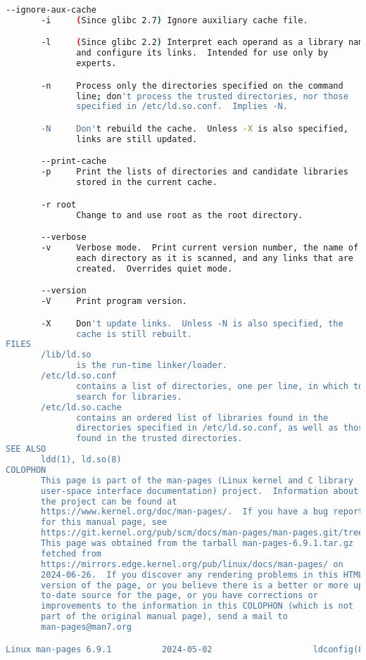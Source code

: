 {{\begin{lstlisting}[language=bash]
       --ignore-aux-cache
       -i     (Since glibc 2.7) Ignore auxiliary cache file.

       -l     (Since glibc 2.2) Interpret each operand as a library name
              and configure its links.  Intended for use only by
              experts.

       -n     Process only the directories specified on the command
              line; don't process the trusted directories, nor those
              specified in /etc/ld.so.conf.  Implies -N.

       -N     Don't rebuild the cache.  Unless -X is also specified,
              links are still updated.

       --print-cache
       -p     Print the lists of directories and candidate libraries
              stored in the current cache.

       -r root
              Change to and use root as the root directory.

       --verbose
       -v     Verbose mode.  Print current version number, the name of
              each directory as it is scanned, and any links that are
              created.  Overrides quiet mode.

       --version
       -V     Print program version.

       -X     Don't update links.  Unless -N is also specified, the
              cache is still rebuilt.
FILES
       /lib/ld.so
              is the run-time linker/loader.
       /etc/ld.so.conf
              contains a list of directories, one per line, in which to
              search for libraries.
       /etc/ld.so.cache
              contains an ordered list of libraries found in the
              directories specified in /etc/ld.so.conf, as well as those
              found in the trusted directories.
SEE ALSO
       ldd(1), ld.so(8)
COLOPHON
       This page is part of the man-pages (Linux kernel and C library
       user-space interface documentation) project.  Information about
       the project can be found at 
       https://www.kernel.org/doc/man-pages/.  If you have a bug report
       for this manual page, see
       https://git.kernel.org/pub/scm/docs/man-pages/man-pages.git/tree/CONTRIBUTING.
       This page was obtained from the tarball man-pages-6.9.1.tar.gz
       fetched from
       https://mirrors.edge.kernel.org/pub/linux/docs/man-pages/ on
       2024-06-26.  If you discover any rendering problems in this HTML
       version of the page, or you believe there is a better or more up-
       to-date source for the page, or you have corrections or
       improvements to the information in this COLOPHON (which is not
       part of the original manual page), send a mail to
       man-pages@man7.org

Linux man-pages 6.9.1          2024-05-02                    ldconfig(8)
\end{lstlisting}
}}
\endinput  %
